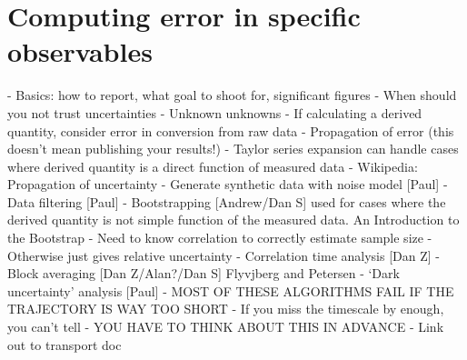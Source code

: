 \section{Computing error in specific observables}
- Basics: how to report, what goal to shoot for, significant figures
- When should you not trust uncertainties
    - Unknown unknowns
- If calculating a derived quantity, consider error in conversion from raw data 
    - Propagation of error (this doesn’t mean publishing your results!)
    - Taylor series expansion can handle cases where derived quantity is a direct function of measured data
    - Wikipedia: Propagation of uncertainty
    - Generate synthetic data with noise model [Paul]
    - Data filtering [Paul]
    - Bootstrapping [Andrew/Dan S]
used for cases where the derived quantity is not simple function of the measured data.
An Introduction to the Bootstrap
    - Need to know correlation to correctly estimate sample size
    - Otherwise just gives relative uncertainty
- Correlation time analysis [Dan Z]
- Block averaging [Dan Z/Alan?/Dan S] Flyvjberg and Petersen 
- ‘Dark uncertainty’ analysis [Paul]
- MOST OF THESE ALGORITHMS FAIL IF THE TRAJECTORY IS WAY TOO SHORT
    - If you miss the timescale by enough, you can’t tell
    - YOU HAVE TO THINK ABOUT THIS IN ADVANCE
- Link out to transport doc